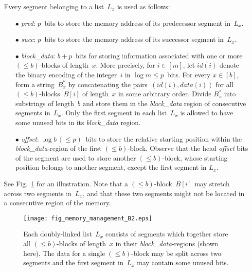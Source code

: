 \documentclass{llncs}
\begin{document}
Every segment belonging to a list~$L_{x}$ is used as follows:
\begin{itemize}
\item[{\raise0.3pt\hbox{$\bullet$}}]
  \emph{pred}:
  $p$~bits to store the memory address of its predecessor segment in~$L_{x}$.
\item[{\raise0.3pt\hbox{$\bullet$}}]
  \emph{succ}:
  $p$~bits to store the memory address of its successor segment in~$L_{x}$.
\item[{\raise0.3pt\hbox{$\bullet$}}]
  \emph{block\_data}:
  $b+p$~bits for storing information associated with one or more $(\leq b)$-blocks
  of length~$x$.
  More precisely, for $i \in [m]$, let $id(i)$ denote the binary
  encoding of the integer~$i$ in $\log m \le p$~bits.
  For every $x \in [b]$, form a string~$B^{\ast}_{x}$ by
  concatenating the pairs~$(id(i), data(i))$ for all $(\leq b)$-blocks~$B[i]$ of
  length~$x$ in some arbitrary order.
  Divide $B^{\ast}_x$ into substrings of length~$b$ and store them in the
  \emph{block\_data} region of consecutive segments in~$L_{x}$.
  Only the first segment in each list~$L_{x}$ is allowed to have some unused
  bits in its \emph{block\_data} region.
\item[{\raise0.3pt\hbox{$\bullet$}}]
  \emph{offset}:
  $\log b \, (\leq p)$~bits to store the relative starting position within
  the \emph{block\_data}-region of the first $(\leq b)$-block.
  Observe that the head \emph{offset} bits of the segment are used
  to store another $(\leq b)$-block, whose starting position belongs to another
  segment, except the first segment in $L_{x}$.
\end{itemize}

See Fig.~\ref{figure2: fig_memory_management_B} for an illustration.
Note that a $(\leq b)$-block~$B[i]$ may stretch across two segments
in~$L_{x}$, and that these two segments might not be located in
a consecutive region of the memory.

\begin{figure}[h!]
\begin{center}
  \texttt{[image: fig\_memory\_management\_B2.eps]}
\caption{Each doubly-linked list~$L_{x}$ consists of segments which together
store all $(\leq b)$-blocks of length~$x$ in their \emph{block\_data}-regions
(shown here).
The data for a single $(\leq b)$-block may be split across two segments
and the first segment in~$L_{x}$ may contain some unused bits.}
\label{figure2: fig_memory_management_B}
\vspace*{-5mm}
\end{center}
\end{figure}
\end{document}
